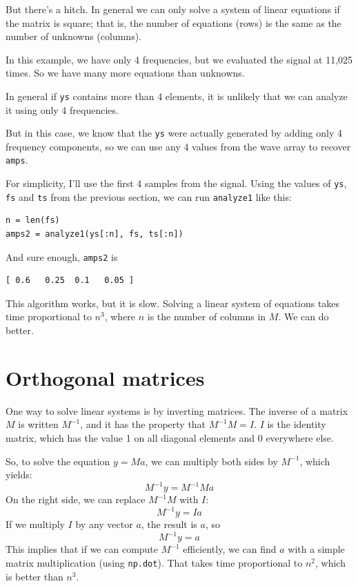 \documentclass[12pt]{book}
\begin{document}
But there's a hitch.  In general we can only solve a system of linear
equations if the matrix is square; that is, the number of equations
(rows) is the same as the number of unknowns (columns).

In this example, we have only 4 frequencies, but we evaluated the
signal at 11,025 times.  So we have many more equations than unknowns.

In general if {\tt ys}
contains more than 4 elements, it is unlikely that we can analyze it
using only 4 frequencies.

But in this case, we know that the {\tt ys} were actually generated by
adding only 4 frequency components, so we can use any 4 values from
the wave array to recover {\tt amps}.

For simplicity, I'll use the first 4 samples from the signal.
Using the values of {\tt ys}, {\tt fs} and {\tt ts} from
the previous section, we can run {\tt analyze1} like this:

\begin{verbatim}
n = len(fs)
amps2 = analyze1(ys[:n], fs, ts[:n])
\end{verbatim}

And sure enough, {\tt amps2} is

\begin{verbatim}
[ 0.6   0.25  0.1   0.05 ]
\end{verbatim}

This algorithm works, but it is slow.  Solving a linear
system of equations takes time proportional to $n^3$, where $n$ is
the number of columns in $M$.  We can do better.


\section{Orthogonal matrices}

One way to solve linear systems is by inverting matrices.  The
inverse of a matrix $M$ is written $M^{-1}$, and it has the property
that $M^{-1}M = I$.  $I$ is the identity matrix, which has
the value 1 on all diagonal elements and 0 everywhere else.

So, to solve the equation $y = Ma$, we can multiply both sides by
$M^{-1}$, which yields:
%
\[ M^{-1}y = M^{-1} M a \]
%
On the right side, we can replace $M^{-1}M$ with $I$:
%
\[ M^{-1}y = I a \]
%
If we multiply $I$ by any vector $a$, the result is $a$, so  
%
\[ M^{-1}y = a \]
%
This implies that if we can compute $M^{-1}$ efficiently, we can find
$a$ with a simple matrix multiplication (using {\tt np.dot}).  That
takes time proportional to $n^2$, which is better than $n^3$.
\end{document}

